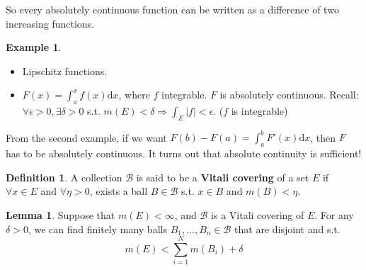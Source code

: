 \documentclass{article}
\theoremstyle{definition}
\newtheorem{ex}{Example}
\newtheorem{lem}{Lemma}
\newtheorem{dfn}{Definition}
\begin{document}
So every absolutely continuous function can be written as a difference of two increasing functions. 

\begin{ex}
  
  \begin{itemize}
    \item Lipschitz functions.
    \item $F(x) = \int_a^x f(x) \mathrm{d} x$, where $f$ integrable. $F$ is absolutely continuous. Recall: $\forall \epsilon > 0, \exists \delta > 0$ s.t. $m(E) < \delta \Rightarrow \int_E |f| < \epsilon$. ($f$ is integrable) 
  \end{itemize}

\end{ex}

From the second example, if  we want $F(b) - F(a) = \int_a^b F'(x) \mathrm{d} x$, then $F$ has to be absolutely continuous. It turns out that absolute continuity is sufficient!

\begin{dfn}
	A collection $\mathcal{B}$ is said to be a \textbf{Vitali covering} of a set $E$ if $\forall x \in E$ and $\forall \eta > 0$, exists a ball $B \in \mathcal{B}$ s.t. $x \in B$ and $m(B) < \eta$. 
\end{dfn}

\begin{lem}
  Suppose that $m(E) < \infty$, and $\mathcal{B}$ is a Vitali covering of $E$. For any $\delta > 0$, we can find finitely many balls $B_1, ...,B_n \in \mathcal{B}$ that are disjoint and s.t.
  \[
    m(E) < \sum_{i = 1}^N m(B_i) + \delta
  \]
\end{lem}
\end{document}
